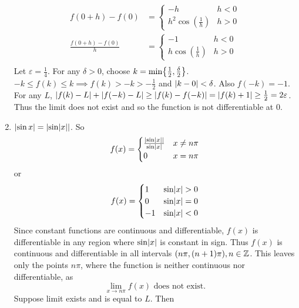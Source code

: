 \documentclass[12pt]{article}
\begin{document}
\begin{enumerate}[label=(\alph*)]
    \begin{align*}
        f(0 + h) - f(0) &= 
        \begin{cases}
            -h & h < 0 \\
            h^{2} \cos(\frac{1}{h}) & h > 0
        \end{cases} \\
        \frac{f(0 + h) - f(0)}{h} &=
        \begin{cases}
            -1 & h < 0 \\
            h \cos(\frac{1}{h}) & h > 0
        \end{cases} \\
    \end{align*}
    Let $\varepsilon = \frac{1}{4}$. For any $\delta > 0$, choose $k = \min \set{\frac{1}{2}, \frac{\delta}{2}}$. $-k \leq f(k) \leq k \implies f(k) > -k > -\frac{1}{2}$ and $\abs{ k - 0 } < \delta$. Also $f(-k) = -1$. For any $L$, $\abs{ f(k) - L } + \abs{ f(-k) - L } \geq \abs{ f(k) - f(-k) } = \abs{ f(k) + 1 } \geq \frac{1}{2} = 2 \varepsilon$. Thus the limit does not exist and so the function is not differentiable at 0.

    \item $\abs{ \sin x } = \abs{ \sin \abs{ x } }$. So \[
        f(x) = 
        \begin{cases}
            \frac{\abs{ \sin \abs{ x } }}{\sin \abs{ x }} & x \neq n \pi \\
            0 & x = n \pi
        \end{cases}
    \] or \[
        f(x) =
        \begin{cases}
            1 & \sin \abs{ x } > 0 \\
            0 & \sin \abs{ x } = 0 \\
            -1 & \sin \abs{ x } < 0
        \end{cases}
    \] Since constant functions are continuous and differentiable, $f(x)$ is differentiable in any region where $\sin \abs{ x }$ is constant in sign. Thus $f(x)$ is continuous and differentiable in all intervals $(n\pi, (n+1)\pi), n \in \mathbb{Z}$. This leaves only the points $n\pi$, where the function is neither continuous nor differentiable, as \[
        \lim_{x \to n\pi} f(x) \text{ does not exist.}
    \] Suppose limit exists and is equal to $L$. Then 
\end{enumerate}

\end{document}
